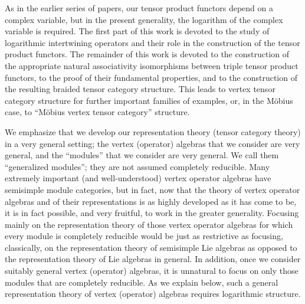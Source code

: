 \documentclass[12pt]{article}
\begin{document}
As in the earlier series of papers, our tensor product functors depend
on a complex variable, but in the present generality, the logarithm of
the complex variable is required.  The first part of this work is
devoted to the study of logarithmic intertwining operators and their
role in the construction of the tensor product functors.  The
remainder of this work is devoted to the construction of the
appropriate natural associativity isomorphisms between triple tensor
product functors, to the proof of their fundamental properties, and to
the construction of the resulting braided tensor category structure.
This leads to vertex tensor category structure for further important
families of examples, or, in the M\"obius case, to ``M\"obius vertex
tensor category'' structure.

We emphasize that we develop our representation theory (tensor
category theory) in a very general setting; the vertex (operator)
algebras that we consider are very general, and the ``modules'' that
we consider are very general.  We call them ``generalized modules'';
they are not assumed completely reducible.  Many extremely important
(and well-understood) vertex operator algebras have semisimple module
categories, but in fact, now that the theory of vertex operator
algebras and of their representations is as highly developed as it has
come to be, it is in fact possible, and very fruitful, to work in the
greater generality.  Focusing mainly on the representation theory of
those vertex operator algebras for which every module is completely
reducible would be just as restrictive as focusing, classically, on
the representation theory of semisimple Lie algebras as opposed to the
representation theory of Lie algebras in general.  In addition, once
we consider suitably general vertex (operator) algebras, it is
unnatural to focus on only those modules that are completely
reducible.  As we explain below, such a general representation theory
of vertex (operator) algebras requires logarithmic structure.
\end{document}
